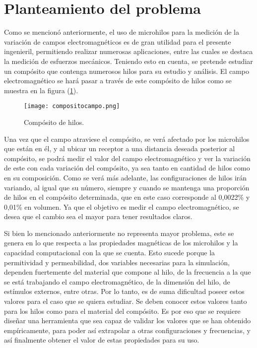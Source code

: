 \documentclass[12pt,letterpaper]{article}
\numberwithin{equation}{section}
\begin{document}
\pagebreak

\section{Planteamiento del problema}

Como se mencionó anteriormente, el uso de microhilos para la medición de la variación de campos electromagnéticos es de gran utilidad para el presente ingenieril, permitiendo realizar numerosas aplicaciones, entre las cuales se destaca la medición de esfuerzos mecánicos. Teniendo esto en cuenta, se pretende estudiar un compósito que contenga numerosos hilos para su estudio y análisis. El campo electromagnético se hará pasar a través de este compósito de hilos como se muestra en la figura (\ref{fig: compositoproblema.png}).

\begin{figure}[H]
	\centering\texttt{[image: compositocampo.png]}
	\caption{Compósito de hilos.}
	\label{fig: compositoproblema.png}
\end{figure} 

Una vez que el campo atraviese el compósito, se verá afectado por los microhilos que están en él, y al ubicar un receptor a una distancia deseada posterior al compósito, se podrá medir el valor del campo electromagnético y ver la variación de este con cada variación del compósito, ya sea tanto en cantidad de hilos como en su composición. Como se verá más adelante, las configuraciones de hilos irán variando, al igual que su número, siempre y cuando se mantenga una proporción de hilos en el compósito determinada, que en este caso corresponde al 0,0022\% y 0,01\% en volumen. Ya que el objetivo es medir el campo electromagnético, se desea que el cambio sea el mayor para tener resultados claros.

Si bien lo mencionado anteriormente no representa mayor problema, este se genera en lo que respecta a las propiedades magnéticas de los microhilos y la capacidad computacional con la que se cuenta. Esto sucede porque la permitividad y permeabilidad, dos variables necesarias para la simulación, dependen fuertemente del material que compone al hilo, de la frecuencia a la que se está trabajando el campo electromagnético, de la dimensión del hilo, de estímulos externos, entre otras. Por lo tanto, es de suma dificultad poseer estos valores para el caso que se quiera estudiar. Se deben conocer estos valores tanto para los hilos como para el material del compósito. Es por eso que se requiere diseñar una herramienta que sea capaz de validar los valores que se han obtenido empíricamente, para poder así extrapolar a otras configuraciones y frecuencias, y así finalmente obtener el valor de estas propiedades para su uso.
 
\end{document}
